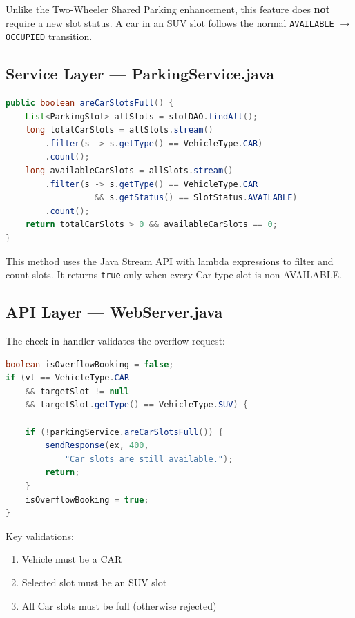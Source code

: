 \documentclass[12pt,a4paper]{article}
\begin{document}
\begin{center}
\end{center}

Unlike the Two-Wheeler Shared Parking enhancement, this feature does \textbf{not} require a new slot status. A car in an SUV slot follows the normal \texttt{AVAILABLE} $\rightarrow$ \texttt{OCCUPIED} transition.

\subsection{Service Layer — ParkingService.java}

\begin{lstlisting}[language=Java, caption={areCarSlotsFull() Method}]
public boolean areCarSlotsFull() {
    List<ParkingSlot> allSlots = slotDAO.findAll();
    long totalCarSlots = allSlots.stream()
        .filter(s -> s.getType() == VehicleType.CAR)
        .count();
    long availableCarSlots = allSlots.stream()
        .filter(s -> s.getType() == VehicleType.CAR 
                  && s.getStatus() == SlotStatus.AVAILABLE)
        .count();
    return totalCarSlots > 0 && availableCarSlots == 0;
}
\end{lstlisting}

This method uses the Java Stream API with lambda expressions to filter and count slots. It returns \texttt{true} only when every Car-type slot is non-AVAILABLE.

\subsection{API Layer — WebServer.java}
The check-in handler validates the overflow request:

\begin{lstlisting}[language=Java, caption={Overflow Validation in Check-in API}]
boolean isOverflowBooking = false;
if (vt == VehicleType.CAR 
    && targetSlot != null 
    && targetSlot.getType() == VehicleType.SUV) {
    
    if (!parkingService.areCarSlotsFull()) {
        sendResponse(ex, 400, 
            "Car slots are still available.");
        return;
    }
    isOverflowBooking = true;
}
\end{lstlisting}

Key validations:
\begin{enumerate}[noitemsep]
    \item Vehicle must be a CAR
    \item Selected slot must be an SUV slot
    \item All Car slots must be full (otherwise rejected)
\end{enumerate}
\end{document}
